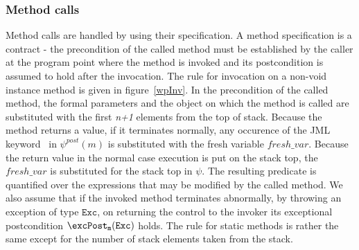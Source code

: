 

\subsubsection{Method calls}
Method calls are handled by using their specification. A method specification is a contract - the precondition of the called method
must be established by the caller at the program point where the method is invoked and its postcondition is assumed to hold after the invocation. The rule for
invocation on a non-void instance method is given in figure~\ref{wpInv}. In the precondition of the called method, the formal parameters and the object on which the method is called are substituted with the first \textit{n+1} elements from the top of stack. 
Because the method returns a value, if it terminates normally, any occurence of the JML keyword \result \ in $\psi^{post}(m)$ is substituted with the fresh variable $fresh\_var$.  
Because the return value in the normal case execution is put on the stack top, the $fresh\_var$ is substituted for the stack top in $\psi$. The resulting predicate is quantified over the expressions that may be modified by the called method. We also assume that if the invoked method terminates abnormally, by throwing an exception of type $\texttt{Exc}$, on returning the control to the invoker its exceptional postcondition $\excPost_{\tt{m} }( \tt{Exc} )$ holds. 
The rule for static methods is rather the same except for the number of stack elements taken from the stack.  

